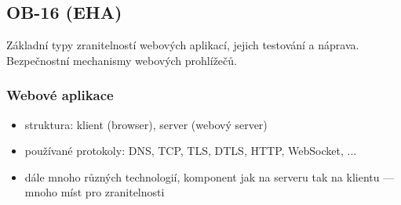 \subsection{OB-16 (EHA)}
Základní typy zranitelností webových aplikací, jejich testování a náprava. Bezpečnostní mechanismy webových prohlížečů.

\subsubsection*{Webové aplikace}
\begin{itemize}
    \item struktura: klient (browser), server (webový server)
    \item používané protokoly: DNS, TCP, TLS, DTLS, HTTP, WebSocket, ...
    \item dále mnoho různých technologií, komponent jak na serveru tak na klientu --- mnoho míst pro zranitelnosti
\end{itemize}

